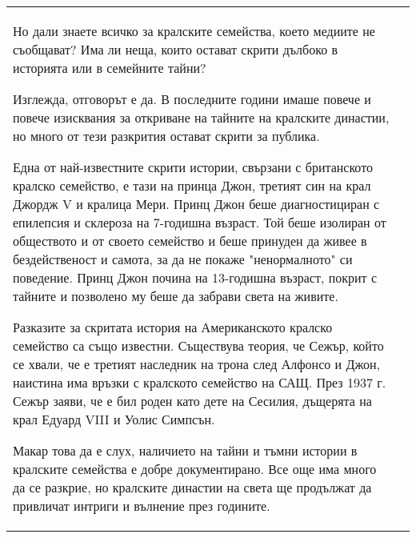 \begin{center}
\begin{supertabular}{l | p{12cm}}
{        Но дали знаете всичко за кралските семейства, което медиите не съобщават? Има ли неща, които остават скрити дълбоко в историята или в семейните тайни?
        
        Изглежда, отговорът е да. В последните години имаше повече и повече изисквания за откриване на тайните на кралските династии, но много от тези разкрития остават скрити за публика.
        
        Една от най-известните скрити истории, свързани с британското кралско семейство, е тази на принца Джон, третият син на крал Джордж V и кралица Мери. Принц Джон беше диагностициран с епилепсия и склероза на 7-годишна възраст. Той беше изолиран от обществото и от своето семейство и беше принуден да живее в бездейственост и самота, за да не покаже "ненормалното" си поведение. Принц Джон почина на 13-годишна възраст, покрит с тайните и позволено му беше да забрави света на живите.
        
        Разказите за скритата история на Американското кралско семейство са също известни. Съществува теория, че Сежър, който се хвали, че е третият наследник на трона след Алфонсо и Джон, наистина има връзки с кралското семейство на САЩ. През 1937 г. Сежър заяви, че е бил роден като дете на Сесилия, дъщерята на крал Едуард VIII и Уолис Симпсън.
        
        Макар това да е слух, наличието на тайни и тъмни истории в кралските семейства е добре документирано. Все още има много да се разкрие, но кралските династии на света ще продължат да привличат интриги и вълнение през годините.}\\
        


\end{supertabular}
\end{center}
